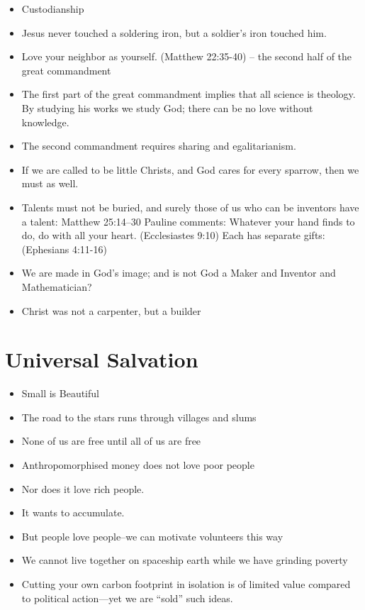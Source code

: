 \documentclass[
	fontsize=10pt, %
	twoside=false, %
	secnumdepth=1, %
]{kaobook}
\begin{document}
\begin{itemize}
  \item Custodianship
\item Jesus never touched a soldering iron, but a soldier’s iron touched him.
\item Love your neighbor as yourself. (Matthew 22:35-40) -- the second half of the great commandment
\item The first part of the great commandment implies that all science is theology. By studying his works we study God; there can be no love without knowledge.
\item The second commandment requires sharing and egalitarianism.
\item If we are called to be little Christs, and God cares for every sparrow, then we must as well.
\item Talents must not be buried, and surely those of us who can be inventors have a talent: Matthew 25:14–30
Pauline comments:
 Whatever your hand finds to do, do with all your heart. (Ecclesiastes 9:10)
Each has separate gifts: (Ephesians 4:11-16)
\item We are made in God’s image; and is not God a Maker and Inventor and Mathematician?
  \item Christ was not a carpenter, but a builder
\end{itemize}

\chapter{Universal Salvation}

\begin{itemize}
\item Small is Beautiful
\item The road to the stars runs through villages and slums
\item None of us are free until all of us are free
\item Anthropomorphised money does not love poor people
\item Nor does it love rich people.
\item It wants to accumulate.
\item But people love people--we can motivate volunteers this way
\item We cannot live together on spaceship earth while we have grinding poverty
\item Cutting your own carbon footprint in isolation is of limited value compared to political action---yet we are “sold” such ideas.
\end{itemize}
\end{document}
